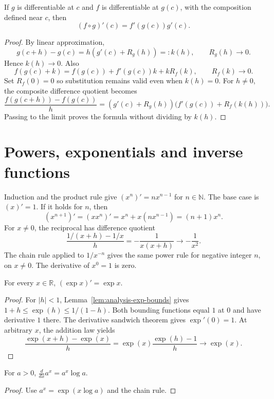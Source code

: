 \begin{theorem}
If $g$ is differentiable at $c$ and $f$ is differentiable at $g(c)$,
with the composition defined near $c$, then
\[
(f\circ g)'(c)=f'(g(c))g'(c).
\]
\end{theorem}
\begin{proof}
By linear approximation,
\[
g(c+h)-g(c)=h(g'(c)+R_g(h))=:k(h),\qquad R_g(h)\to0.
\]
Hence $k(h)\to0$. Also
\[
f(g(c)+k)=f(g(c))+f'(g(c))k+kR_f(k),\qquad R_f(k)\to0.
\]
Set $R_f(0)=0$ so substitution remains valid even when $k(h)=0$.
For $h\ne0$, the composite difference quotient becomes
\[
\frac{f(g(c+h))-f(g(c))}h
=(g'(c)+R_g(h))\bigl(f'(g(c))+R_f(k(h))\bigr).
\]
Passing to the limit proves the formula without dividing by $k(h)$.
\end{proof}

\section{Powers, exponentials and inverse functions}
\begin{example}
Induction and the product rule give $(x^n)'=nx^{n-1}$ for $n\in\mathbb N$.
The base case is $(x)'=1$. If it holds for $n$, then
\[
(x^{n+1})'=(xx^n)'=x^n+x(nx^{n-1})=(n+1)x^n.
\]
For $x\ne0$, the reciprocal has difference quotient
\[
\frac{1/(x+h)-1/x}{h}=-\frac1{x(x+h)}\longrightarrow-\frac1{x^2}.
\]
The chain rule applied to $1/x^{-n}$ gives the same power rule for negative
integer $n$, on $x\ne0$. The derivative of $x^0=1$ is zero.
\end{example}

\begin{proposition}
For every $x\in\mathbb R$, $(\exp x)'=\exp x$.
\end{proposition}
\begin{proof}
For $|h|<1$, Lemma~\ref{lem:analysis-exp-bounds} gives
$1+h\leq\exp(h)\leq1/(1-h)$. Both bounding functions equal $1$ at $0$
and have derivative $1$ there. The derivative sandwich theorem gives
$\exp'(0)=1$. At arbitrary $x$, the addition law yields
\[
\frac{\exp(x+h)-\exp(x)}h
=\exp(x)\frac{\exp(h)-1}h\longrightarrow\exp(x).
\]
\end{proof}
\begin{corollary}
For $a>0$, $\frac d{dx}a^x=a^x\log a$.
\end{corollary}
\begin{proof}
Use $a^x=\exp(x\log a)$ and the chain rule.
\end{proof}

